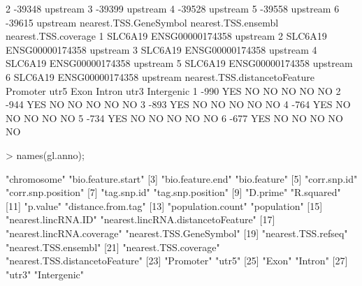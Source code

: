 \documentclass[12pt,fullpage]{article}
\begin{document}
\begin{Schunk}
\begin{Soutput}
2                            -39348                 upstream
3                            -39399                 upstream
4                            -39528                 upstream
5                            -39558                 upstream
6                            -39615                 upstream
  nearest.TSS.GeneSymbol nearest.TSS.ensembl nearest.TSS.coverage
1                SLC6A19     ENSG00000174358             upstream
2                SLC6A19     ENSG00000174358             upstream
3                SLC6A19     ENSG00000174358             upstream
4                SLC6A19     ENSG00000174358             upstream
5                SLC6A19     ENSG00000174358             upstream
6                SLC6A19     ENSG00000174358             upstream
  nearest.TSS.distancetoFeature Promoter utr5 Exon Intron utr3 Intergenic
1                          -990      YES   NO   NO     NO   NO         NO
2                          -944      YES   NO   NO     NO   NO         NO
3                          -893      YES   NO   NO     NO   NO         NO
4                          -764      YES   NO   NO     NO   NO         NO
5                          -734      YES   NO   NO     NO   NO         NO
6                          -677      YES   NO   NO     NO   NO         NO
\end{Soutput}
\begin{Sinput}
> names(gl.anno);
\end{Sinput}
\begin{Soutput}
 [1] "chromosome"                        "bio.feature.start"                
 [3] "bio.feature.end"                   "bio.feature"                      
 [5] "corr.snp.id"                       "corr.snp.position"                
 [7] "tag.snp.id"                        "tag.snp.position"                 
 [9] "D.prime"                           "R.squared"                        
[11] "p.value"                           "distance.from.tag"                
[13] "population.count"                  "population"                       
[15] "nearest.lincRNA.ID"                "nearest.lincRNA.distancetoFeature"
[17] "nearest.lincRNA.coverage"          "nearest.TSS.GeneSymbol"           
[19] "nearest.TSS.refseq"                "nearest.TSS.ensembl"              
[21] "nearest.TSS.coverage"              "nearest.TSS.distancetoFeature"    
[23] "Promoter"                          "utr5"                             
[25] "Exon"                              "Intron"                           
[27] "utr3"                              "Intergenic"                       
\end{Soutput}

\end{Schunk}
\end{document}
